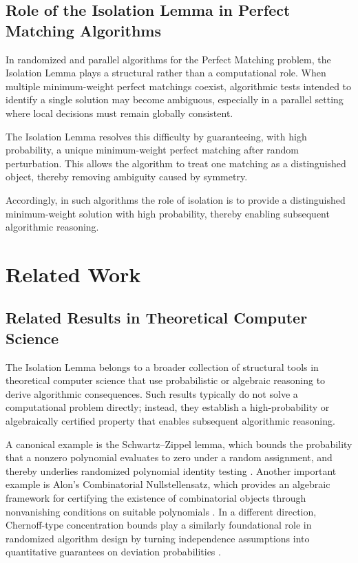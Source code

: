 \subsection{Role of the Isolation Lemma in Perfect Matching Algorithms}

In randomized and parallel algorithms for the Perfect Matching problem, the Isolation Lemma plays a structural rather than a computational role.
When multiple minimum-weight perfect matchings coexist, algorithmic tests intended to identify a single solution may become ambiguous, especially in a parallel setting where local decisions must remain globally consistent.

The Isolation Lemma resolves this difficulty by guaranteeing, with high probability, a unique minimum-weight perfect matching after random perturbation.
This allows the algorithm to treat one matching as a distinguished object, thereby removing ambiguity caused by symmetry.

Accordingly, in such algorithms the role of isolation is to provide a distinguished minimum-weight solution with high probability, thereby enabling subsequent algorithmic reasoning.

\section{Related Work}

\subsection{Related Results in Theoretical Computer Science}

The Isolation Lemma belongs to a broader collection of structural tools in theoretical computer science that use probabilistic or algebraic reasoning to derive algorithmic consequences.
Such results typically do not solve a computational problem directly;
instead, they establish a high-probability or algebraically certified property that enables subsequent algorithmic reasoning.

A canonical example is the Schwartz--Zippel lemma, which bounds the probability that a nonzero polynomial evaluates to zero under a random assignment, and thereby underlies randomized polynomial identity testing \cite{schwartz1980polynomial,zippel1979polynomial}.
Another important example is Alon's Combinatorial Nullstellensatz, which provides an algebraic framework for certifying the existence of combinatorial objects through nonvanishing conditions on suitable polynomials \cite{alon1999nullstellensatz}.
In a different direction, Chernoff-type concentration bounds play a similarly foundational role in randomized algorithm design by turning independence assumptions into quantitative guarantees on deviation probabilities \cite{Mitzenmacher_Upfal_2005,motwani1995randomized}.

